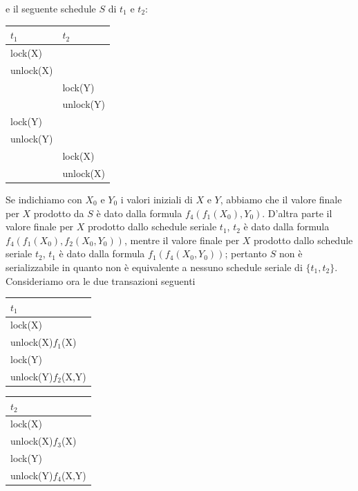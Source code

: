 e il seguente schedule $S$ di $t_1$ e $t_2$:
\begin{center}
 \begin{tabular}{|l|l|}
 \hline
 $t_1$ & $t_2$\\
 \hline
   lock(X)&\\
   unlock(X)&\\
   &lock(Y)\\
   &unlock(Y)\\
   lock(Y)&\\ 
   unlock(Y)&\\
   &lock(X)\\
   &unlock(X)\\
   \hline
  \end{tabular}
\end{center}
Se indichiamo con $X_0$ e $Y_0$ i valori iniziali di $X$ e $Y$, abbiamo che il valore finale per $X$ prodotto da $S$
è dato dalla formula $f_4(f_1(X_0), Y_0)$. D'altra parte il valore finale per $X$ prodotto dallo schedule
seriale $t_1$, $t_2$ è dato dalla formula $f_4(f_1(X_0), f_2(X_0, Y_0))$, mentre il valore finale per $X$ prodotto dallo
schedule seriale $t_2$, $t_1$ è dato dalla formula $f_1(f_4(X_0, Y_0))$; pertanto $S$ non è serializzabile in quanto
non è equivalente a nessuno schedule seriale di $\{t_1, t_2\}$.\\

\noindent Consideriamo ora le due transazioni seguenti
\begin{multicols}{2}  

 \begin{tabular}{|l|}
   \hline
   $t_1$\\
   \hline
   lock(X)\\ 
   unlock(X)$f_1$(X)\\ 
   lock(Y)\\ 
   unlock(Y)$f_2$(X,Y)\\ 
  \hline
 \end{tabular}
 
 \begin{tabular}{|l|}
  \hline
   $t_2$\\
   \hline
   lock(X)\\
   unlock(X)$f_3$(X)\\
   lock(Y)\\
   unlock(Y)$f_4$(X,Y)\\
  \hline
  \end{tabular} 
 \end{multicols}

